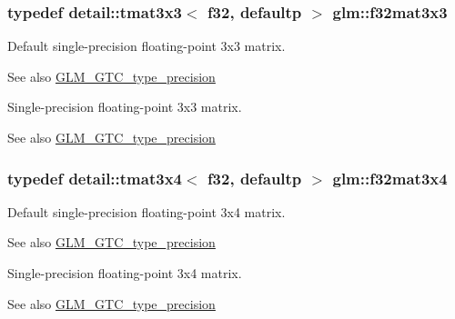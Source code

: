 \subsubsection[{\texorpdfstring{f32mat3x3}{f32mat3x3}}]{\setlength{\rightskip}{0pt plus 5cm}typedef detail\+::tmat3x3$<$ f32, defaultp $>$ {\bf glm\+::f32mat3x3}}\hypertarget{group__gtc__type__precision_ga56465dc40dd0e35221f00bdf44fb7c2e}{}\label{group__gtc__type__precision_ga56465dc40dd0e35221f00bdf44fb7c2e}
Default single-\/precision floating-\/point 3x3 matrix. \begin{DoxySeeAlso}{See also}
\hyperlink{group__gtc__type__precision}{G\+L\+M\+\_\+\+G\+T\+C\+\_\+type\+\_\+precision}
\end{DoxySeeAlso}
Single-\/precision floating-\/point 3x3 matrix. \begin{DoxySeeAlso}{See also}
\hyperlink{group__gtc__type__precision}{G\+L\+M\+\_\+\+G\+T\+C\+\_\+type\+\_\+precision} 
\end{DoxySeeAlso}
\subsubsection[{\texorpdfstring{f32mat3x4}{f32mat3x4}}]{\setlength{\rightskip}{0pt plus 5cm}typedef detail\+::tmat3x4$<$ f32, defaultp $>$ {\bf glm\+::f32mat3x4}}\hypertarget{group__gtc__type__precision_ga9d953c44b7bf260d2f2e61d73dc2ab08}{}\label{group__gtc__type__precision_ga9d953c44b7bf260d2f2e61d73dc2ab08}
Default single-\/precision floating-\/point 3x4 matrix. \begin{DoxySeeAlso}{See also}
\hyperlink{group__gtc__type__precision}{G\+L\+M\+\_\+\+G\+T\+C\+\_\+type\+\_\+precision}
\end{DoxySeeAlso}
Single-\/precision floating-\/point 3x4 matrix. \begin{DoxySeeAlso}{See also}
\hyperlink{group__gtc__type__precision}{G\+L\+M\+\_\+\+G\+T\+C\+\_\+type\+\_\+precision} 
\end{DoxySeeAlso}
